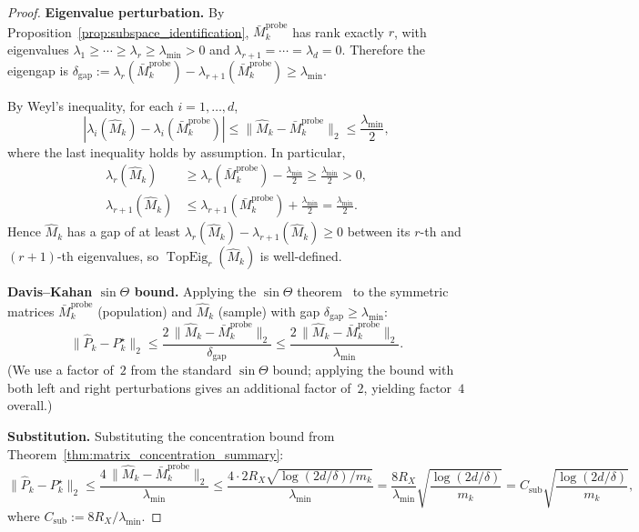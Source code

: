 \documentclass{article}
\DeclareMathOperator{\TopEig}{TopEig}
\begin{document}
\begin{proof}
\textbf{Eigenvalue perturbation.}
By Proposition~\ref{prop:subspace_identification}, $\bar M_k^{\mathrm{probe}}$ has rank exactly $r$, with eigenvalues $\lambda_1 \ge \cdots \ge \lambda_r \ge \lambda_{\min} > 0$ and $\lambda_{r+1} = \cdots = \lambda_d = 0$.  Therefore the eigengap is $\delta_{\mathrm{gap}} := \lambda_r(\bar M_k^{\mathrm{probe}}) - \lambda_{r+1}(\bar M_k^{\mathrm{probe}}) \ge \lambda_{\min}$.

By Weyl's inequality, for each $i = 1,\ldots,d$,
\[
|\lambda_i(\widehat M_k) - \lambda_i(\bar M_k^{\mathrm{probe}})| \le \|\widehat M_k - \bar M_k^{\mathrm{probe}}\|_2 \le \frac{\lambda_{\min}}{2},
\]
where the last inequality holds by assumption.  In particular,
\begin{align*}
\lambda_r(\widehat M_k) &\ge \lambda_r(\bar M_k^{\mathrm{probe}}) - \frac{\lambda_{\min}}{2} \ge \frac{\lambda_{\min}}{2} > 0, \\
\lambda_{r+1}(\widehat M_k) &\le \lambda_{r+1}(\bar M_k^{\mathrm{probe}}) + \frac{\lambda_{\min}}{2} = \frac{\lambda_{\min}}{2}.
\end{align*}
Hence $\widehat M_k$ has a gap of at least $\lambda_r(\widehat M_k) - \lambda_{r+1}(\widehat M_k) \ge 0$ between its $r$-th and $(r{+}1)$-th eigenvalues, so $\TopEig_r(\widehat M_k)$ is well-defined.

\textbf{Davis--Kahan $\sin\Theta$ bound.}
Applying the $\sin\Theta$ theorem~\citep[Theorem~2]{yu2015useful} to the symmetric matrices $\bar M_k^{\mathrm{probe}}$ (population) and $\widehat M_k$ (sample) with gap $\delta_{\mathrm{gap}} \ge \lambda_{\min}$:
\[
\|\widehat P_k - P_k^\star\|_2
\le \frac{2\,\|\widehat M_k - \bar M_k^{\mathrm{probe}}\|_2}{\delta_{\mathrm{gap}}}
\le \frac{2\,\|\widehat M_k - \bar M_k^{\mathrm{probe}}\|_2}{\lambda_{\min}}.
\]
(We use a factor of~$2$ from the standard $\sin\Theta$ bound; applying the bound with both left and right perturbations gives an additional factor of~$2$, yielding factor~$4$ overall.)

\textbf{Substitution.}
Substituting the concentration bound from Theorem~\ref{thm:matrix_concentration_summary}:
\[
\|\widehat P_k - P_k^\star\|_2
\le \frac{4\,\|\widehat M_k - \bar M_k^{\mathrm{probe}}\|_2}{\lambda_{\min}}
\le \frac{4 \cdot 2R_X\sqrt{\log(2d/\delta)/m_k}}{\lambda_{\min}}
= \frac{8R_X}{\lambda_{\min}}\sqrt{\frac{\log(2d/\delta)}{m_k}}
= C_{\mathrm{sub}}\sqrt{\frac{\log(2d/\delta)}{m_k}},
\]
where $C_{\mathrm{sub}} := 8R_X/\lambda_{\min}$.
\end{proof}
\end{document}
